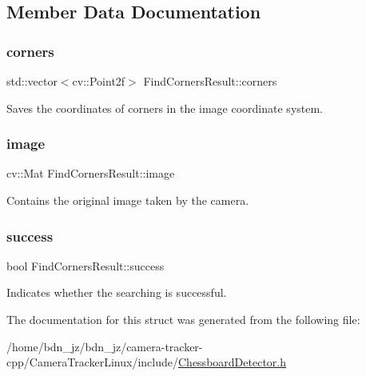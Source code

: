 \subsection{Member Data Documentation}
\mbox{\label{struct_find_corners_result_a138337b67fb9eb6010ec7c9a276a009f}} 
\subsubsection{\texorpdfstring{corners}{corners}}
{\footnotesize\ttfamily std\+::vector$<$cv\+::\+Point2f$>$ Find\+Corners\+Result\+::corners}

Saves the coordinates of corners in the image coordinate system. \mbox{\label{struct_find_corners_result_a8c2fd90c9f86bed108eb777fd237f113}} 
\subsubsection{\texorpdfstring{image}{image}}
{\footnotesize\ttfamily cv\+::\+Mat Find\+Corners\+Result\+::image}

Contains the original image taken by the camera. \mbox{\label{struct_find_corners_result_a53a6b5d4fc0243582800d92b2bc5e706}} 
\subsubsection{\texorpdfstring{success}{success}}
{\footnotesize\ttfamily bool Find\+Corners\+Result\+::success}

Indicates whether the searching is successful. 

The documentation for this struct was generated from the following file\+:\begin{DoxyCompactItemize}
\item 
/home/bdn\+\_\+jz/bdn\+\_\+jz/camera-\/tracker-\/cpp/\+Camera\+Tracker\+Linux/include/\hyperlink{_chessboard_detector_8h}{Chessboard\+Detector.\+h}\end{DoxyCompactItemize}
